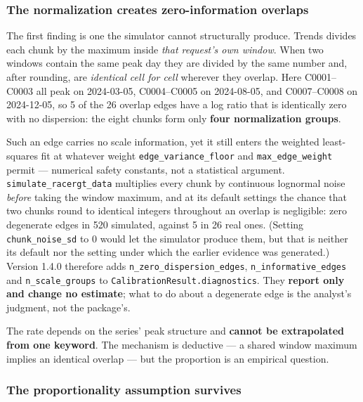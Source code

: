 \documentclass[12pt,a4paper,oneside]{article}
\begin{document}
\subsubsection{The normalization creates zero-information overlaps}

The first finding is one the simulator cannot structurally produce. Trends
divides each chunk by the maximum inside \emph{that request's own window}. When
two windows contain the same peak day they are divided by the same number and,
after rounding, are \emph{identical cell for cell} wherever they overlap. Here
C0001--C0003 all peak on 2024-03-05, C0004--C0005 on 2024-08-05, and
C0007--C0008 on 2024-12-05, so 5 of the 26 overlap edges have a log ratio that
is identically zero with no dispersion: the eight chunks form only \textbf{four
normalization groups}.

Such an edge carries no scale information, yet it still enters the weighted
least-squares fit at whatever weight \texttt{edge\_\allowbreak variance\_\allowbreak floor} and
\texttt{max\_\allowbreak edge\_\allowbreak weight} permit --- numerical safety constants, not a
statistical argument. \texttt{simulate\_\allowbreak racergt\_\allowbreak data} multiplies every chunk by
continuous lognormal noise \emph{before} taking the window maximum, and at its
default settings the chance that two chunks round to identical integers
throughout an overlap is negligible: zero degenerate edges in 520 simulated,
against 5 in 26 real ones. (Setting \texttt{chunk\_\allowbreak noise\_\allowbreak sd} to $0$ would let the
simulator produce them, but that is neither its default nor the setting under
which the earlier evidence was generated.) Version 1.4.0 therefore adds
\texttt{n\_\allowbreak zero\_\allowbreak dispersion\_\allowbreak edges}, \texttt{n\_\allowbreak informative\_\allowbreak edges} and
\texttt{n\_scale\_groups} to \texttt{CalibrationResult.\allowbreak diagnostics}. They
\textbf{report only and change no estimate}; what to do about a degenerate edge
is the analyst's judgment, not the package's.

The rate depends on the series' peak structure and \textbf{cannot be
extrapolated from one keyword}. The mechanism is deductive --- a shared window
maximum implies an identical overlap --- but the proportion is an empirical
question.

\subsubsection{The proportionality assumption survives}
\end{document}
